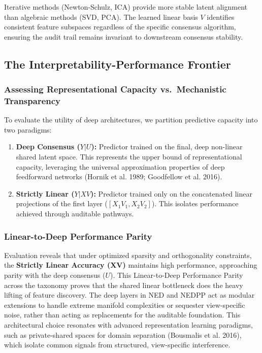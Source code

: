 \documentclass[
  letterpaper,
]{report}
\providecommand{\tightlist}{%
  \setlength{\itemsep}{0pt}\setlength{\parskip}{0pt}}
\begin{document}
Iterative methods (Newton-Schulz, ICA) provide more stable latent
alignment than algebraic methods (SVD, PCA). The learned linear basis
\(V\) identifies consistent feature subspaces regardless of the specific
consensus algorithm, ensuring the audit trail remains invariant to
downstream consensus stability.

\subsection{The Interpretability-Performance
Frontier}\label{the-interpretability-performance-frontier}

\subsubsection{Assessing Representational Capacity vs.~Mechanistic
Transparency}\label{assessing-representational-capacity-vs.-mechanistic-transparency}

To evaluate the utility of deep architectures, we partition predictive
capacity into two paradigms:

\begin{enumerate}
\def\labelenumi{\arabic{enumi}.}
\tightlist
\item
  \textbf{Deep Consensus (\(Y|U\)):} Predictor trained on the final,
  deep non-linear shared latent space. This represents the upper bound
  of representational capacity, leveraging the universal approximation
  properties of deep feedforward networks (Hornik et al. 1989;
  Goodfellow et al. 2016).
\item
  \textbf{Strictly Linear (\(Y|XV\)):} Predictor trained only on the
  concatenated linear projections of the first layer
  (\([X_1 V_1, X_2 V_2]\)). This isolates performance achieved through
  auditable pathways.
\end{enumerate}

\subsubsection{Linear-to-Deep Performance
Parity}\label{linear-to-deep-performance-parity}

Evaluation reveals that under optimized sparsity and orthogonality
constraints, the \textbf{Strictly Linear Accuracy (XV)} maintains high
performance, approaching parity with the deep consensus (\(U\)). This
Linear-to-Deep Performance Parity across the taxonomy proves that the
shared linear bottleneck does the heavy lifting of feature discovery.
The deep layers in NED and NEDPP act as modular extensions to handle
extreme manifold complexities or sequester view-specific noise, rather
than acting as replacements for the auditable foundation. This
architectural choice resonates with advanced representation learning
paradigms, such as private-shared spaces for domain separation
(Bousmalis et al. 2016), which isolate common signals from structured,
view-specific interference.
\end{document}
